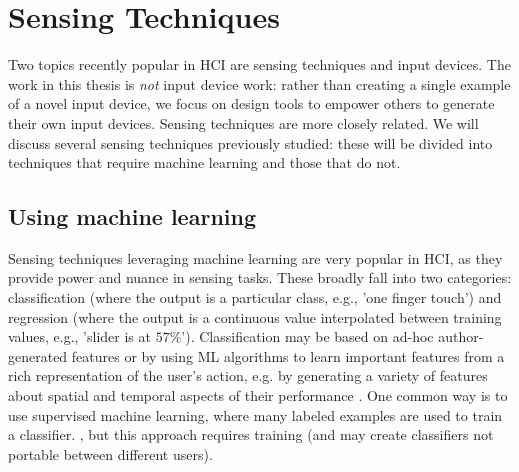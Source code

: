 \section{Sensing Techniques}

    

    
    Two topics recently popular in HCI are sensing techniques and input devices. The work in this thesis is \emph{not} input device work: rather than creating a single example of a novel input device, we focus on design tools to empower others to generate their own input devices. Sensing techniques are more closely related. We will discuss several sensing techniques previously studied: these will be divided into techniques that require machine learning and those that do not.

    \subsection{Using machine learning}
    Sensing techniques leveraging machine learning are very popular in HCI, as they provide power and nuance in sensing tasks. These broadly fall into two categories: classification (where the output is a particular class, e.g., 'one finger touch') and regression (where the output is a continuous value interpolated between training values, e.g., 'slider is at $57\%$'). Classification may be based on ad-hoc author-generated features \cite{hudson-whack} or by using ML algorithms to learn important features from a rich representation of the user’s action, e.g. by generating a variety of features about spatial and temporal aspects of their performance \cite{harrison-scratchinput,harrison-skinput,murray-smith-stane}. One common way is to use supervised machine learning, where many labeled examples are used to train a classifier. \cite{sato-touche,ono-touchandactivate,laput-acoustruments}, but this approach requires training (and may create classifiers not portable between different users).
    
